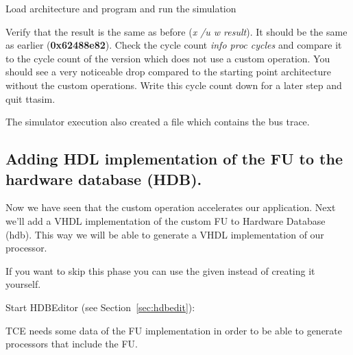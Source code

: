 \documentclass[twoside]{tceusermanual}
\begin{document}
\begin{enumerate}
Load architecture and program and run the simulation




Verify that the result is the same as before (\textit{x /u w result}). It
should be the same as earlier (\textbf{0x62488e82}).
Check the cycle count \textit{info proc cycles}  %
and compare it to the cycle 
count of the version which does not use a custom operation. You should see 
a very noticeable drop compared to the starting point architecture without
the custom operations. Write this cycle count down for a later step and quit ttasim.

The simulator execution also created a file
 which contains the bus
trace.

\end{enumerate}

\subsection{Adding HDL implementation of the FU to the hardware database
(HDB).}
\label{par:AddToHDB}

Now we have seen that the custom operation accelerates our application. Next
we'll add a VHDL implementation of the custom FU to Hardware Database (hdb).
This way we will be able to generate a VHDL implementation of our processor.

If you want to skip this phase you can use the given 
instead of creating it yourself.

Start HDBEditor (see Section~\ref{sec:hdbedit}): \\

TCE needs some data of the FU implementation in order to be able to
generate processors that include the FU. \\
\end{document}
